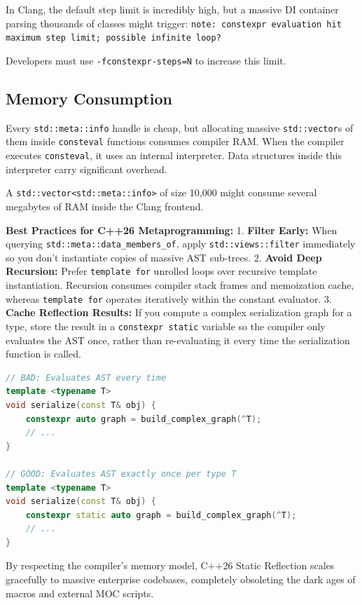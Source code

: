 In Clang, the default step limit is incredibly high, but a massive DI container parsing thousands of classes might trigger:
\texttt{note: constexpr evaluation hit maximum step limit; possible infinite loop?}

Developers must use \texttt{-fconstexpr-steps=N} to increase this limit.

\subsection{Memory Consumption}

Every \texttt{std::meta::info} handle is cheap, but allocating massive \texttt{std::vector}s of them inside \texttt{consteval} functions consumes compiler RAM. When the compiler executes \texttt{consteval}, it uses an internal interpreter. Data structures inside this interpreter carry significant overhead.

A \texttt{std::vector<std::meta::info>} of size 10,000 might consume several megabytes of RAM inside the Clang frontend.

\textbf{Best Practices for C++26 Metaprogramming:}
1. \textbf{Filter Early:} When querying \texttt{std::meta::data_members_of}, apply \texttt{std::views::filter} immediately so you don't instantiate copies of massive AST sub-trees.
2. \textbf{Avoid Deep Recursion:} Prefer \texttt{template for} unrolled loops over recursive template instantiation. Recursion consumes compiler stack frames and memoization cache, whereas \texttt{template for} operates iteratively within the constant evaluator.
3. \textbf{Cache Reflection Results:} If you compute a complex serialization graph for a type, store the result in a \texttt{constexpr static} variable so the compiler only evaluates the AST once, rather than re-evaluating it every time the serialization function is called.

\begin{lstlisting}[language=C++]
// BAD: Evaluates AST every time
template <typename T>
void serialize(const T& obj) {
    constexpr auto graph = build_complex_graph(^T);
    // ...
}

// GOOD: Evaluates AST exactly once per type T
template <typename T>
void serialize(const T& obj) {
    constexpr static auto graph = build_complex_graph(^T);
    // ...
}
\end{lstlisting}

By respecting the compiler's memory model, C++26 Static Reflection scales gracefully to massive enterprise codebases, completely obsoleting the dark ages of macros and external MOC scripts.

